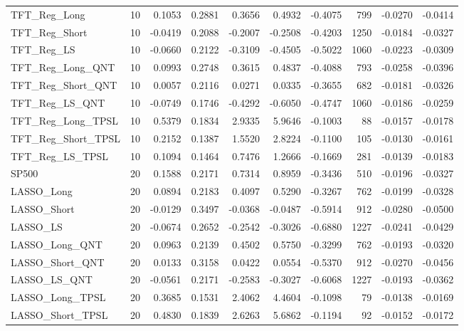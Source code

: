 \begin{tabular}{llrrrrrrrr}
TFT\_Reg\_Long & 10 & 0.1053 & 0.2881 & 0.3656 & 0.4932 & -0.4075 & 799 & -0.0270 & -0.0414 \\
\cline{1-10}
TFT\_Reg\_Short & 10 & -0.0419 & 0.2088 & -0.2007 & -0.2508 & -0.4203 & 1250 & -0.0184 & -0.0327 \\
\cline{1-10}
TFT\_Reg\_LS & 10 & -0.0660 & 0.2122 & -0.3109 & -0.4505 & -0.5022 & 1060 & -0.0223 & -0.0309 \\
\cline{1-10}
TFT\_Reg\_Long\_QNT & 10 & 0.0993 & 0.2748 & 0.3615 & 0.4837 & -0.4088 & 793 & -0.0258 & -0.0396 \\
\cline{1-10}
TFT\_Reg\_Short\_QNT & 10 & 0.0057 & 0.2116 & 0.0271 & 0.0335 & -0.3655 & 682 & -0.0181 & -0.0326 \\
\cline{1-10}
TFT\_Reg\_LS\_QNT & 10 & -0.0749 & 0.1746 & -0.4292 & -0.6050 & -0.4747 & 1060 & -0.0186 & -0.0259 \\
\cline{1-10}
TFT\_Reg\_Long\_TPSL & 10 & 0.5379 & 0.1834 & 2.9335 & 5.9646 & -0.1003 & 88 & -0.0157 & -0.0178 \\
\cline{1-10}
TFT\_Reg\_Short\_TPSL & 10 & 0.2152 & 0.1387 & 1.5520 & 2.8224 & -0.1100 & 105 & -0.0130 & -0.0161 \\
\cline{1-10}
TFT\_Reg\_LS\_TPSL & 10 & 0.1094 & 0.1464 & 0.7476 & 1.2666 & -0.1669 & 281 & -0.0139 & -0.0183 \\
\cline{1-10}
SP500 & 20 & 0.1588 & 0.2171 & 0.7314 & 0.8959 & -0.3436 & 510 & -0.0196 & -0.0327 \\
\cline{1-10}
LASSO\_Long & 20 & 0.0894 & 0.2183 & 0.4097 & 0.5290 & -0.3267 & 762 & -0.0199 & -0.0328 \\
\cline{1-10}
LASSO\_Short & 20 & -0.0129 & 0.3497 & -0.0368 & -0.0487 & -0.5914 & 912 & -0.0280 & -0.0500 \\
\cline{1-10}
LASSO\_LS & 20 & -0.0674 & 0.2652 & -0.2542 & -0.3026 & -0.6880 & 1227 & -0.0241 & -0.0429 \\
\cline{1-10}
LASSO\_Long\_QNT & 20 & 0.0963 & 0.2139 & 0.4502 & 0.5750 & -0.3299 & 762 & -0.0193 & -0.0320 \\
\cline{1-10}
LASSO\_Short\_QNT & 20 & 0.0133 & 0.3158 & 0.0422 & 0.0554 & -0.5370 & 912 & -0.0270 & -0.0456 \\
\cline{1-10}
LASSO\_LS\_QNT & 20 & -0.0561 & 0.2171 & -0.2583 & -0.3027 & -0.6068 & 1227 & -0.0193 & -0.0362 \\
\cline{1-10}
LASSO\_Long\_TPSL & 20 & 0.3685 & 0.1531 & 2.4062 & 4.4604 & -0.1098 & 79 & -0.0138 & -0.0169 \\
\cline{1-10}
LASSO\_Short\_TPSL & 20 & 0.4830 & 0.1839 & 2.6263 & 5.6862 & -0.1194 & 92 & -0.0152 & -0.0172 \\

\end{tabular}
